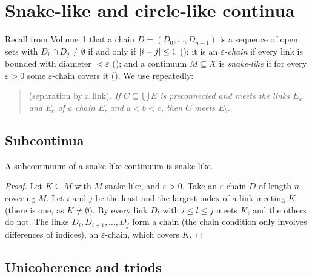 \chapter{Snake-like and circle-like continua}\label{ch:snake}

Recall from Volume~1 that a chain $D=(D_0,\dots,D_{n-1})$ is a sequence of open sets with $D_i\cap
D_j\ne\emptyset$ if and only if $\left\lvert i-j\right\rvert\le1$ (); it is an
\emph{$\varepsilon$-chain} if every link is bounded with diameter $<\varepsilon$
(); and a continuum $M\subseteq X$ is \emph{snake-like} if for every $\varepsilon>0$
some $\varepsilon$-chain covers it (). We use repeatedly:

\begin{quote}
 (separation by a link). \emph{If $C\subseteq\bigcup E$ is preconnected and meets the
links $E_a$ and $E_c$ of a chain $E$, and $a<b<c$, then $C$ meets $E_b$.}
\end{quote}

\section{Subcontinua}

\begin{theorem}\label{thm:snake-sub}
A subcontinuum of a snake-like continuum is snake-like.
\end{theorem}

\begin{proof}
Let $K\subseteq M$ with $M$ snake-like, and $\varepsilon>0$. Take an $\varepsilon$-chain $D$ of length $n$
covering $M$. Let $i$ and $j$ be the least and the largest index of a link meeting $K$ (there is one,
as $K\ne\emptyset$). By  every link $D_l$ with $i\le l\le j$ meets $K$, and the others do
not. The links $D_i,D_{i+1},\dots,D_j$ form a chain (the chain condition only involves differences
of indices), an $\varepsilon$-chain, which covers $K$.
\end{proof}


\section{Unicoherence and triods}

